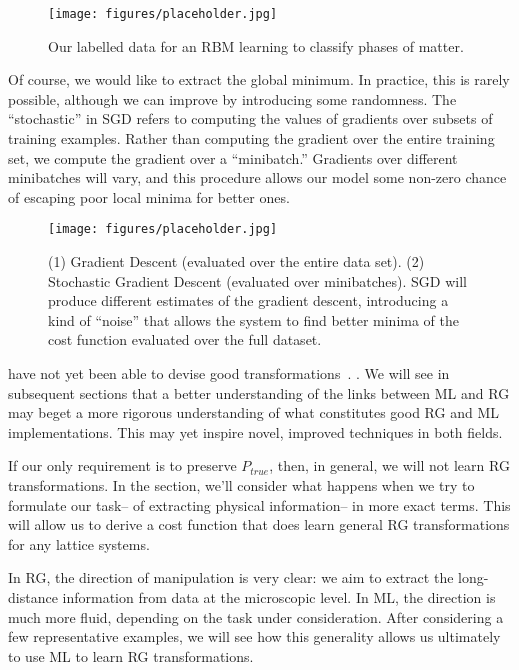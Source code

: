 \begin{figure}[ht]
  \centering
  \texttt{[image: figures/placeholder.jpg]}
  \caption{Our labelled data for an RBM learning to classify phases of
    matter.\label{fig:rbm-classifier-data} }
\end{figure}

Of course, we would like to extract the global minimum. In practice,
this is rarely possible, although we can improve by introducing some
randomness. The ``stochastic'' in SGD refers to computing the values
of gradients over subsets of training examples. Rather than computing
the gradient over the entire training set, we compute the gradient
over a ``minibatch.'' Gradients over different minibatches will vary,
and this procedure allows our model some non-zero chance of escaping
poor local minima for better ones.

\begin{figure}[ht]
  \centering
  \texttt{[image: figures/placeholder.jpg]}
  \caption{(1) Gradient Descent (evaluated over the entire data
    set). (2) Stochastic Gradient Descent (evaluated over
    minibatches). SGD will produce different estimates of the gradient
    descent, introducing a kind of ``noise'' that allows the system to
    find better minima of the cost function evaluated over the full
    dataset.\label{fig:gradient-descent} }
\end{figure}



have not yet been able to devise good transformations~\cite{kjr}. . We
will see in subsequent sections that a better understanding of the
links between ML and RG may beget a more rigorous understanding of
what constitutes good RG and ML implementations. This may yet inspire
novel, improved techniques in both fields.


If our only requirement is to preserve $P_{true}$, then, in general,
we will not learn RG transformations. In the section, we'll consider
what happens when we try to formulate our task-- of extracting
physical information-- in more exact terms. This will allow us to
derive a cost function that does learn general RG transformations for
any lattice systems.


In RG, the direction of manipulation is very clear: we aim to extract
the long-distance information from data at the microscopic level. In
ML, the direction is much more fluid, depending on the task under
consideration. After considering a few representative examples, we
will see how this generality allows us ultimately to use ML to learn
RG transformations.





